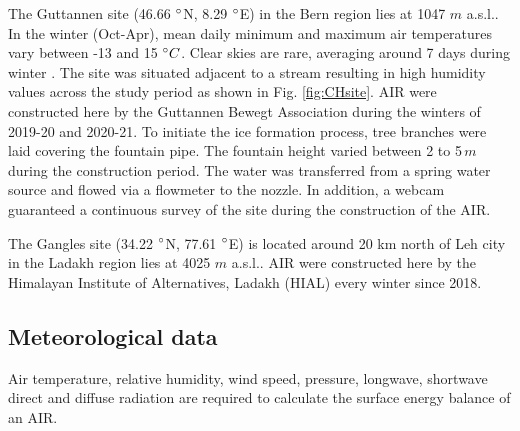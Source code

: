 \documentclass[utf8]{frontiersSCNS} %
\begin{document}
The Guttannen site (46.66 $\degree$N, 8.29 $\degree$E) in the Bern region lies at 1047 $m$ a.s.l.. In the winter (Oct-Apr), mean
daily minimum and maximum air temperatures vary between -13 and 15 $\degree C$. Clear skies are rare, averaging around 7
days during winter \citep{eispalast}. The site was situated adjacent to a stream resulting in high humidity values
across the study period as shown in Fig. \ref{fig:CHsite}. AIR were constructed here by the Guttannen Bewegt Association
during the winters of 2019-20 and 2020-21. To initiate the ice formation process, tree branches were laid covering the
fountain pipe.  The fountain height varied between 2 to 5\,$m$ during the construction period. The water was transferred
from a spring water source and flowed via a flowmeter to the nozzle. In addition, a webcam guaranteed a continuous
survey of the site during the construction of the AIR.



The Gangles site (34.22 $\degree$N, 77.61 $\degree$E) is located around 20 km north of Leh city in the Ladakh region
lies at 4025 $m$ a.s.l.. AIR were constructed here by the Himalayan Institute of Alternatives, Ladakh (HIAL) every
winter since 2018.


\subsection{Meteorological data} 
Air temperature, relative humidity, wind speed, pressure, longwave, shortwave direct and diffuse radiation are required
to calculate the surface energy balance of an AIR. 
\end{document}
